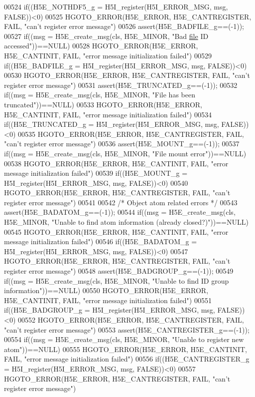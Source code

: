\begin{DoxyCode}
00524 if((H5E\_NOTHDF5\_g = H5I\_register(H5I\_ERROR\_MSG, msg, FALSE))<0)
00525     HGOTO\_ERROR(H5E\_ERROR, H5E\_CANTREGISTER, FAIL, "can't register error message")
00526 assert(H5E\_BADFILE\_g==(-1));
00527 if((msg = H5E\_create\_msg(cls, H5E\_MINOR, "Bad \hyperlink{structfile}{file} ID accessed"))==NULL)
00528     HGOTO\_ERROR(H5E\_ERROR, H5E\_CANTINIT, FAIL, "error message initialization failed")
00529 if((H5E\_BADFILE\_g = H5I\_register(H5I\_ERROR\_MSG, msg, FALSE))<0)
00530     HGOTO\_ERROR(H5E\_ERROR, H5E\_CANTREGISTER, FAIL, "can't register error message")
00531 assert(H5E\_TRUNCATED\_g==(-1));
00532 if((msg = H5E\_create\_msg(cls, H5E\_MINOR, "File has been truncated"))==NULL)
00533     HGOTO\_ERROR(H5E\_ERROR, H5E\_CANTINIT, FAIL, "error message initialization failed")
00534 if((H5E\_TRUNCATED\_g = H5I\_register(H5I\_ERROR\_MSG, msg, FALSE))<0)
00535     HGOTO\_ERROR(H5E\_ERROR, H5E\_CANTREGISTER, FAIL, "can't register error message")
00536 assert(H5E\_MOUNT\_g==(-1));
00537 if((msg = H5E\_create\_msg(cls, H5E\_MINOR, "File mount error"))==NULL)
00538     HGOTO\_ERROR(H5E\_ERROR, H5E\_CANTINIT, FAIL, "error message initialization failed")
00539 if((H5E\_MOUNT\_g = H5I\_register(H5I\_ERROR\_MSG, msg, FALSE))<0)
00540     HGOTO\_ERROR(H5E\_ERROR, H5E\_CANTREGISTER, FAIL, "can't register error message")
00541 
00542 \textcolor{comment}{/* Object atom related errors */}
00543 assert(H5E\_BADATOM\_g==(-1));
00544 if((msg = H5E\_create\_msg(cls, H5E\_MINOR, "Unable to find atom information (already closed?)"))==NULL)
00545     HGOTO\_ERROR(H5E\_ERROR, H5E\_CANTINIT, FAIL, "error message initialization failed")
00546 if((H5E\_BADATOM\_g = H5I\_register(H5I\_ERROR\_MSG, msg, FALSE))<0)
00547     HGOTO\_ERROR(H5E\_ERROR, H5E\_CANTREGISTER, FAIL, "can't register error message")
00548 assert(H5E\_BADGROUP\_g==(-1));
00549 if((msg = H5E\_create\_msg(cls, H5E\_MINOR, "Unable to find ID group information"))==NULL)
00550     HGOTO\_ERROR(H5E\_ERROR, H5E\_CANTINIT, FAIL, "error message initialization failed")
00551 if((H5E\_BADGROUP\_g = H5I\_register(H5I\_ERROR\_MSG, msg, FALSE))<0)
00552     HGOTO\_ERROR(H5E\_ERROR, H5E\_CANTREGISTER, FAIL, "can't register error message")
00553 assert(H5E\_CANTREGISTER\_g==(-1));
00554 if((msg = H5E\_create\_msg(cls, H5E\_MINOR, "Unable to register new atom"))==NULL)
00555     HGOTO\_ERROR(H5E\_ERROR, H5E\_CANTINIT, FAIL, "error message initialization failed")
00556 if((H5E\_CANTREGISTER\_g = H5I\_register(H5I\_ERROR\_MSG, msg, FALSE))<0)
00557     HGOTO\_ERROR(H5E\_ERROR, H5E\_CANTREGISTER, FAIL, "can't register error message")

\end{DoxyCode}
